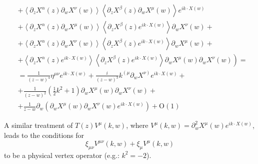 \documentclass[10pt,a4paper]{article}
\begin{document}
\begin{align*}
        &\left. + \left\langle \partial_z X^{\alpha}\left( z \right) \partial_w
        X^{\nu}\left( w \right) \right\rangle \left\langle \partial_z
        X^{\beta}\left( z \right) \partial_w X^{\mu}\left( w \right)
        \right\rangle e^{i k \cdot X\left( w \right)} \right.
        \\
        &\left. + \left\langle \partial_z X^{\alpha}\left( z \right) \partial_w
        X^{\mu}\left( w \right) \right\rangle \left\langle \partial_z
        X^{\beta}\left( z \right) e^{i k \cdot X\left( w \right)} \right\rangle
        \partial_w X^{\nu}\left( w \right) + \right.
        \\
        &\left. + \left\langle \partial_z X^{\alpha}\left( z \right) \partial_w
        X^{\nu}\left( w \right) \right\rangle \left\langle \partial_z
        X^{\beta}\left( z \right) e^{i k \cdot X\left( w \right)} \right\rangle
        \partial_w X^{\mu}\left( w \right) + \right.
        \\
        &\left. + \left\langle \partial_z X^{\alpha}\left( z \right) e^{i k
        \cdot X\left( w \right)} \right\rangle \left\langle \partial_z
        X^{\beta}\left( z \right) e^{i k \cdot X\left( w \right)} \right\rangle
        \partial_w X^{\mu}\left( w \right) \partial_w X^{\nu} \left( w \right)
        \right) =
        \\
        &= \frac{1}{\left( z - w \right)^4} \eta^{\mu\nu} e^{i k \cdot X\left(
        w \right)} + \frac{i}{\left( z - w \right)^3} k^{\left( \mu \right.}
        \partial_w X^{\left. \nu \right)} e^{i k \cdot X\left( w \right)} +
        \\
        &+ \frac{1}{\left( z - w \right)^2} \left( \frac{1}{2} k^2 + 1 \right)
        \partial_w X^{\mu}\left( w \right) \partial_w X^{\nu}\left( w \right) +
        \\
        &+ \frac{1}{z - w} \partial_w \left( \partial_w X^{\mu}\left( w \right)
        \partial_w X^{\nu}\left( w \right) e^{i k \cdot X\left( w \right)}
        \right) + \mathrm{O}\left( 1 \right)
    \end{align*}

    A similar treatment of $T\left( z \right) V^{\mu}\left( k, w \right)$,
    where $V^{\mu}\left( k, w \right) = \partial^2_w X^{\mu}\left( w \right)
    e^{i k \cdot X\left( w \right)}$, leads to the conditions for
    \begin{equation*}
        \xi_{\mu\nu} V^{\mu\nu}\left( k, w \right) + \xi_{\mu} V^{\mu}\left( k,
        w \right)
    \end{equation*}
    to be a physical vertex operator (e.g.: $k^2 = -2$).
\end{document}

